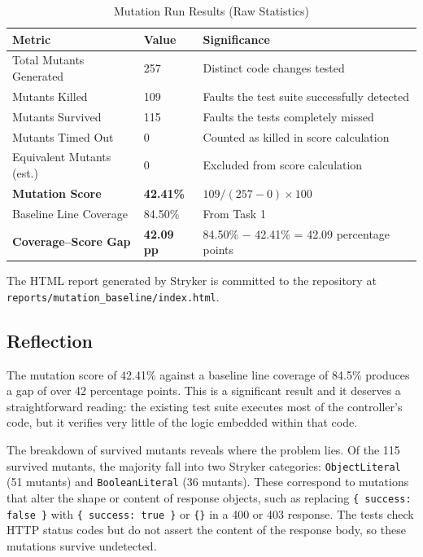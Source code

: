 \documentclass[12pt, a4paper]{article}
\begin{document}
\begin{table}[h!]
\centering
\begin{tabular}{lll}
\toprule
\textbf{Metric}              & \textbf{Value}   & \textbf{Significance}                              \\
\midrule
Total Mutants Generated      & 257              & Distinct code changes tested                       \\
\textcolor{killed}{Mutants Killed}        & 109              & Faults the test suite successfully detected        \\
\textcolor{survived}{Mutants Survived}    & 115              & Faults the tests completely missed                 \\
Mutants Timed Out            & 0                & Counted as killed in score calculation             \\
Equivalent Mutants (est.)    & 0                & Excluded from score calculation                    \\
\textbf{Mutation Score}      & \textbf{42.41\%} & $109 / (257 - 0) \times 100$                       \\
Baseline Line Coverage       & 84.50\%          & From Task 1                                        \\
\textbf{Coverage--Score Gap} & \textbf{42.09 pp} & 84.50\% $-$ 42.41\% = 42.09 percentage points    \\
\bottomrule
\end{tabular}
\caption{Mutation Run Results (Raw Statistics)}
\end{table}

The HTML report generated by Stryker is committed to the repository at \texttt{reports/mutation\_baseline/index.html}.

\subsection{Reflection}

The mutation score of 42.41\% against a baseline line coverage of 84.5\% produces a gap of over 42 percentage points. This is a significant result and it deserves a straightforward reading: the existing test suite executes most of the controller's code, but it verifies very little of the logic embedded within that code.

The breakdown of survived mutants reveals where the problem lies. Of the 115 survived mutants, the majority fall into two Stryker categories: \texttt{ObjectLiteral} (51 mutants) and \texttt{BooleanLiteral} (36 mutants). These correspond to mutations that alter the shape or content of response objects, such as replacing \texttt{\{ success: false \}} with \texttt{\{ success: true \}} or \texttt{\{\}} in a 400 or 403 response. The tests check HTTP status codes but do not assert the content of the response body, so these mutations survive undetected.
\end{document}
